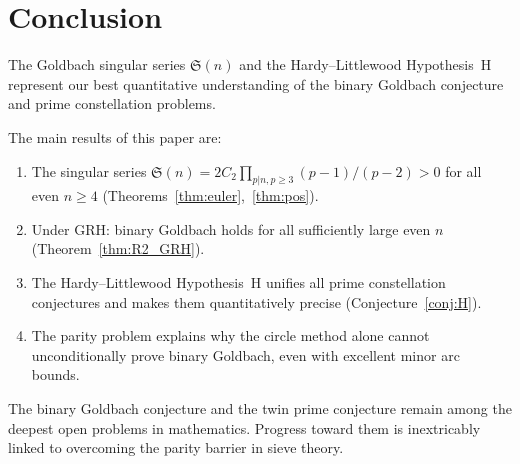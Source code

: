 \documentclass[12pt,a4paper]{amsart}
\theoremstyle{definition}
\begin{document}
\section{Conclusion}

The Goldbach singular series $\mathfrak{S}(n)$ and the Hardy--Littlewood
Hypothesis~H represent our best quantitative understanding of the binary
Goldbach conjecture and prime constellation problems.

The main results of this paper are:
\begin{enumerate}
  \item The singular series $\mathfrak{S}(n) = 2C_2 \prod_{p|n, p\geq 3}(p-1)/(p-2) > 0$
    for all even $n \geq 4$ (Theorems~\ref{thm:euler},~\ref{thm:pos}).
  \item Under GRH: binary Goldbach holds for all sufficiently large even $n$
    (Theorem~\ref{thm:R2_GRH}).
  \item The Hardy--Littlewood Hypothesis~H unifies all prime constellation
    conjectures and makes them quantitatively precise (Conjecture~\ref{conj:H}).
  \item The parity problem explains why the circle method alone cannot
    unconditionally prove binary Goldbach, even with excellent minor arc bounds.
\end{enumerate}

The binary Goldbach conjecture and the twin prime conjecture remain
among the deepest open problems in mathematics.  Progress toward them
is inextricably linked to overcoming the parity barrier in sieve theory.
\end{document}
